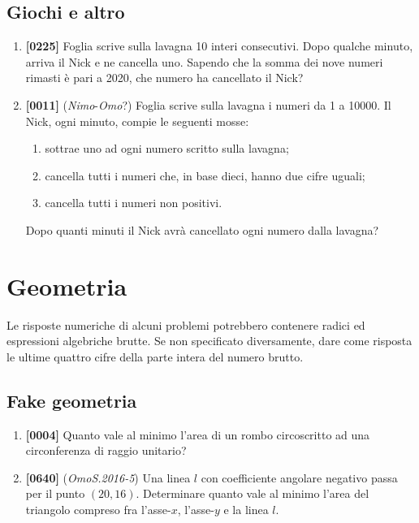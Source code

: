 \documentclass[10pt]{article}
\begin{document}
\subsection{Giochi e altro}
\begin{enumerate}
    \item \textbf{[0225]} Foglia scrive sulla lavagna 10 interi consecutivi. Dopo qualche minuto, arriva il Nick e ne cancella uno. Sapendo che la somma dei nove numeri rimasti è pari a 2020, che numero ha cancellato il Nick?

    \item \textbf{[0011]} (\textit{Nimo}-\textit{Omo}?) Foglia scrive sulla lavagna i numeri da 1 a 10000. Il Nick, ogni minuto, compie le seguenti mosse:
    \begin{enumerate}
        \item sottrae uno ad ogni numero scritto sulla lavagna;
        \item cancella tutti i numeri che, in base dieci, hanno due cifre uguali;
        \item cancella tutti i numeri non positivi.
    \end{enumerate}
    Dopo quanti minuti il Nick avrà cancellato ogni numero dalla lavagna?
\end{enumerate}


\newpage
\section{Geometria}

Le risposte numeriche di alcuni problemi potrebbero contenere radici ed espressioni algebriche brutte. Se non specificato diversamente, dare come risposta le ultime quattro cifre della parte intera del numero brutto.

\subsection{Fake geometria}
\begin{enumerate}
    \item \textbf{[0004]} Quanto vale al minimo l'area di un rombo circoscritto ad una circonferenza di raggio unitario?
    
    \item \textbf{[0640]} (\textit{OmoS.2016-5}) Una linea $l$ con coefficiente angolare negativo passa per il punto $(20,16)$. Determinare quanto vale al minimo l'area del triangolo compreso fra l'asse-$x$, l'asse-$y$ e la linea $l$.
\end{enumerate}
\end{document}
